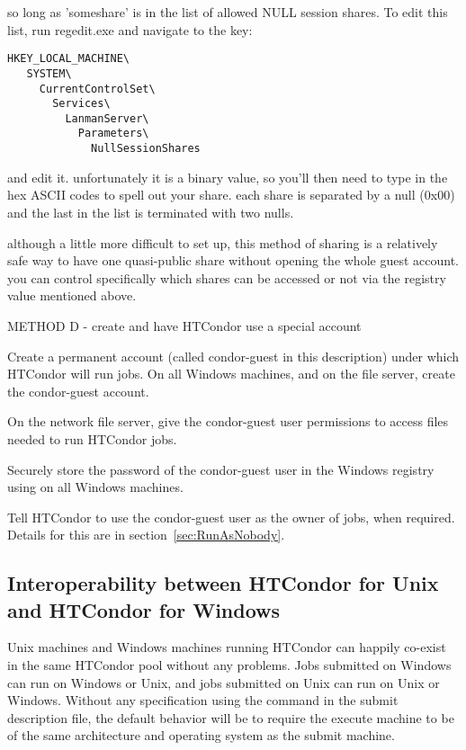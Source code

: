so long as 'someshare' is in the list of allowed NULL session shares.  To
edit this list, run regedit.exe and navigate to the key:

\begin{verbatim}
HKEY_LOCAL_MACHINE\
   SYSTEM\
     CurrentControlSet\
       Services\
         LanmanServer\
           Parameters\
             NullSessionShares
\end{verbatim}

and edit it.  unfortunately it is a binary value, so you'll then need to
type in the hex ASCII codes to spell out your share.  each share is
separated by a null (0x00) and the last in the list is terminated with
two nulls.

although a little more difficult to set up, this method of sharing is a
relatively safe way to have one quasi-public share without opening the
whole guest account.  you can control specifically which shares can be 
accessed or not via the registry value mentioned above.


METHOD D -  create and have HTCondor use a special account

Create a permanent account (called condor-guest in this description)
under which HTCondor will run jobs.
On all Windows machines, and on the file server, create the
condor-guest account.

On the network file server, give the condor-guest user permissions
to access files needed to run HTCondor jobs.

Securely store the password of the condor-guest user in the
Windows registry using  on all Windows
machines.

Tell HTCondor to use the condor-guest user as the owner of jobs,
when required.
Details for this are in 
section~\ref{sec:RunAsNobody}.

\subsection{Interoperability between HTCondor for Unix and HTCondor for Windows}

Unix machines and Windows machines running HTCondor can happily
co-exist in the same HTCondor pool without any problems.
Jobs submitted on Windows can run on Windows or Unix,
and jobs submitted on Unix can run on Unix or Windows.
Without any specification
using the  command in the submit description file,
the default behavior will be to 
require the execute machine to be of the same architecture and operating
system as the submit machine.

